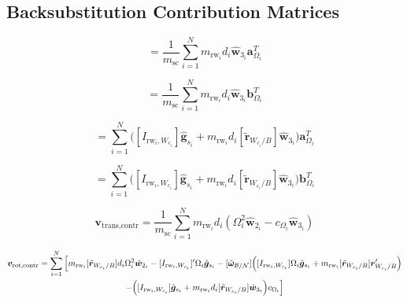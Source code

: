 \documentclass[]{BasiliskReportMemo}
\begin{document}
\subsection{Backsubstitution Contribution Matrices}

\begin{equation}
[A_\text{contr}] = \frac{1}{m_{\text{sc}}}\sum\limits_{i=1}^{N}m_{\text{rw}_i}d_i\hat{\bm{w}}_{3_i}\bm{a}_{\Omega_i}^T
\end{equation}

\begin{equation}
[B_\text{contr}] = \frac{1}{m_{\text{sc}}}\sum\limits_{i=1}^{N}m_{\text{rw}_i}d_i\hat{\bm{w}}_{3_i}\bm{b}_{\Omega_i}^T
\end{equation}

\begin{equation}
[C_\text{contr}] = \sum\limits_{i=1}^{N}\Big([I_{\text{rw}_i,W_{c_i}}]\hat{\bm{g}}_{s_i} + m_{\text{rw}_i}d_i[\tilde{\bm{r}}_{W_{c_i}/B}]\hat{\bm{w}}_{3_i}\Big)\bm{a}_{\Omega_i}^T
\end{equation}

\begin{equation}
[D_\text{contr}] = \sum\limits_{i=1}^{N}\Big([I_{\text{rw}_i,W_{c_i}}]\hat{\bm{g}}_{s_i} + m_{\text{rw}_i}d_i[\tilde{\bm{r}}_{W_{c_i}/B}]\hat{\bm{w}}_{3_i}\Big)\bm{b}_{\Omega_i}^T
\end{equation}

\begin{equation}
\bm{v}_\text{trans,contr} = \frac{1}{m_{\text{sc}}}\sum\limits_{i=1}^{N}m_{\text{rw}_i}d_i\left(\Omega_i^2\hat{\bm{w}}_{2_i}-c_{\Omega_i}\hat{\bm{w}}_{3_i}\right)
\end{equation}

\begin{multline}
\bm{v}_\text{rot,contr} = \sum\limits_{i=1}^{N} \Big[ m_{\text{rw}_i}[\tilde{\bm{r}}_{W_{c_i}/B}]d_i \Omega_i^2\hat{\bm{w}}_{2_i}-[I_{\text{rw}_i,W_{c_i}}]'\Omega_i \hat{\bm{g}}_{s_i} -[\tilde{\bm\omega}_{\cal B/N}]\Big([I_{\text{rw}_i,W_{c_i}}]\Omega_i \hat{\bm{g}}_{s_i}+ m_{\text{rw}_i}[\tilde{\bm{r}}_{W_{c_i}/B}]\bm{r}'_{W_{c_i}/B}\Big) \\
-\Big([I_{\text{rw}_i,W_{c_i}}]\hat{\bm{g}}_{s_i} + m_{\text{rw}_i}d_i[\tilde{\bm{r}}_{W_{c_i}/B}]\hat{\bm{w}}_{3_i}\Big)c_{\Omega_i} \Big]
\end{multline}
\end{document}
